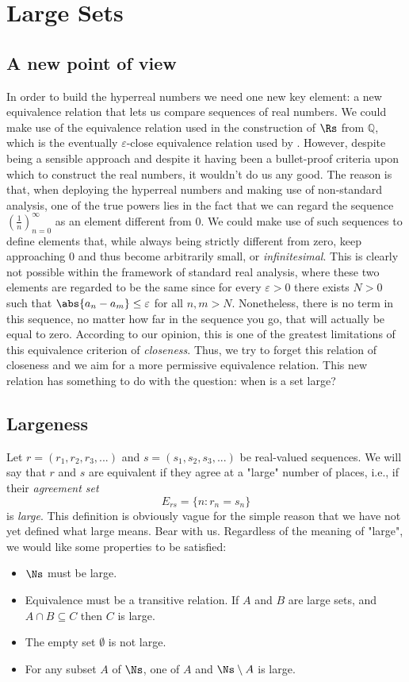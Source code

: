 \section{Large Sets} \label{sec:filters}
\subsection{A new point of view}
In order to build the hyperreal numbers we need one new key element: a new equivalence relation that lets us compare sequences of real numbers. We could make use of the equivalence relation used in the construction of $\Rs$ from $\mathbb{Q}$, which is the eventually $\varepsilon$-close equivalence relation used by \cite{tao2022analysis}. However, despite being a sensible approach and despite it having been a bullet-proof criteria upon which to construct the real numbers, it wouldn't do us any good. The reason is that, when deploying the hyperreal numbers and making use of non-standard analysis, one of the true powers lies in the fact that we can regard the sequence $(\frac{1}{n})_{n=0}^\infty$ as an element different from $0$. We could make use of such sequences to define elements that, while always being strictly different from zero, keep approaching $0$ and thus become arbitrarily small, or \textit{infinitesimal}. This is clearly not possible within the framework of standard real analysis, where these two elements are regarded to be the same since for every $\varepsilon>0$ there exists $N>0$ such that $\abs{a_n - a_m} \leq \varepsilon$ for all $n, m > N$. Nonetheless, there is no term in this sequence, no matter how far in the sequence you go, that will actually be equal to zero.
According to our opinion, this is one of the greatest limitations of this equivalence criterion of \textit{closeness}. Thus, we try to forget this relation of closeness and we aim for a more permissive equivalence relation.
This new relation has something to do with the question: when is a set large?

\subsection{Largeness}
Let $r=(r_1,r_2,r_3,...)$ and $s=(s_1,s_2,s_3,...)$ be real-valued sequences. We will say that $r$ and $s$ are equivalent if they agree at a "large" number of places, i.e., if their \textit{agreement set}
\begin{equation*}
    E_{rs} = \{n:r_n=s_n\}
\end{equation*}
is \textit{large}. This definition is obviously vague for the simple reason that we have not yet defined what large means. Bear with us. Regardless of the meaning of "large", we would like some properties to be satisfied:
\begin{itemize}
    \item $\Ns$ must be large.
    \item Equivalence must be a transitive relation. If $A$ and $B$ are large sets, and $A \cap B \subseteq C$ then $C$ is large.
    \item The empty set $\emptyset$ is not large. 
    \item For any subset $A$ of $\Ns$, one of $A$ and $\Ns \setminus A$ is large.
\end{itemize}

